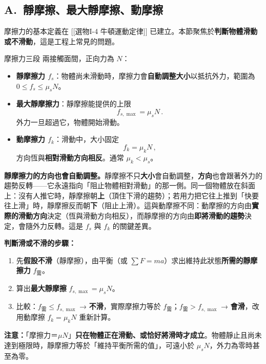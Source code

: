 \documentclass[11pt]{article}
\begin{document}
\subsection*{\sffamily A.\ 靜摩擦、最大靜摩擦、動摩擦}

摩擦力的基本定義在 [[選物I-4 牛頓運動定律]] 已建立。本節聚焦於\textbf{判斷物體滑動或不滑動}，這是工程上常見的問題。

\begin{補充框}{摩擦力三段}
兩接觸面間，正向力為 $N$：
\begin{itemize}\setlength{\itemsep}{1pt}
\item \textbf{靜摩擦力 $f_s$}：物體尚未滑動時，摩擦力會\textbf{自動調整大小}以抵抗外力，範圍為 $0 \le f_s \le \mu_s N$。
\item \textbf{最大靜摩擦力}：靜摩擦能提供的上限
$$\boxed{\,f_{s,\max} = \mu_s N\,}.$$
外力一旦超過它，物體開始滑動。
\item \textbf{動摩擦力 $f_k$}：滑動中，大小固定
$$\boxed{\,f_k = \mu_k N\,},$$
方向恆與\textbf{相對滑動方向相反}。通常 $\mu_k < \mu_s$。
\end{itemize}

\textbf{靜摩擦力的方向也會自動調整。}靜摩擦不只\textbf{大小}會自動調整，\textbf{方向}也會跟著外力的趨勢反轉——它永遠指向「阻止物體相對滑動」的那一側。同一個物體放在斜面上：沒有人推它時，靜摩擦朝\textbf{上}（頂住下滑的趨勢）；若用力把它往上推到「快要往上滑」時，靜摩擦反而朝\textbf{下}（阻止上滑）。這與動摩擦不同：動摩擦的方向由\textbf{實際的滑動方向}決定（恆與滑動方向相反），而靜摩擦的方向由\textbf{即將滑動的趨勢}決定，會隨外力反轉。這是 $f_s$ 與 $f_k$ 的關鍵差異。

\textbf{判斷滑或不滑的步驟：}
\begin{enumerate}\setlength{\itemsep}{1pt}
\item 先\textbf{假設不滑}（靜摩擦），由平衡（或 $\sum F=ma$）求出維持此狀態\textbf{所需的靜摩擦力} $f_{\text{需}}$。
\item 算出\textbf{最大靜摩擦} $f_{s,\max}=\mu_s N$。
\item 比較：$f_{\text{需}} \le f_{s,\max}$ → \textbf{不滑}，實際摩擦力等於 $f_{\text{需}}$；$f_{\text{需}} > f_{s,\max}$ → \textbf{會滑}，改用動摩擦 $f_k=\mu_k N$ 重新計算。
\end{enumerate}

\textbf{注意：}「摩擦力＝$\mu N$」\textbf{只在物體正在滑動、或恰好將滑時才成立}。物體靜止且尚未達到極限時，靜摩擦力等於「維持平衡所需的值」，可遠小於 $\mu_s N$，外力為零時甚至為零。
\end{補充框}
\end{document}
